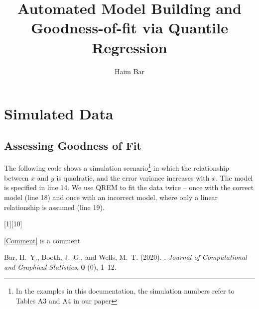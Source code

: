 \documentclass[a4paper,12pt]{article}
\title{Automated Model Building and Goodness-of-fit via Quantile Regression}
\author{Haim Bar}
\begin{document}
\maketitle

\section{Simulated Data}
\subsection{Assessing Goodness of Fit}
The following code shows a simulation scenario\footnote{In the examples in this documentation, the simulation numbers refer to Tables A3 and A4 in our paper} in which the relationship between $x$ and $y$ is quadratic, and the error variance increases with $x$. The model is specified in line 14.
We use QREM to fit the data twice -- once with the correct model (line 18) and once with an incorrect model, where only a linear relationship is assumed (line 19).
 
[1][10]

\ref{Comment} is a comment
% 
% 
% 
% 



\begin{thebibliography}{99}
{\rm Bar, H.~Y., Booth, J.~G., {\rm and} Wells, M.~T.} (2020).
.
\newblock \emph{Journal of Computational and Graphical Statistics}, {\bf  0} (0),  1--12.
\end{thebibliography}
\end{document}
